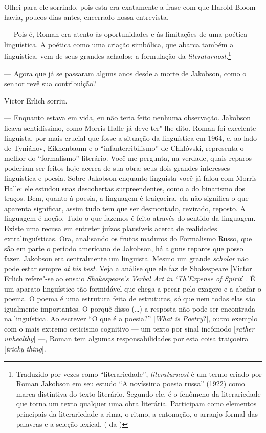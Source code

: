 Olhei para ele sorrindo, pois esta era exatamente a frase com que Harold
Bloom havia, poucos dias antes, encerrado nossa entrevista.

--- Pois é, Roman era atento às oportunidades e às limitações de uma
poética linguística. A poética como uma criação simbólica, que abarca
também a linguística, vem de seus grandes achados: a formulação da
\emph{literaturnost}.\footnote{Traduzido por vezes como 
``literariedade'', \emph{literaturnost} é um termo criado por Roman 
Jakobson em seu estudo ``A novíssima poesia russa'' 
(1922) como marca distintiva do texto literário. Segundo ele, é o
 fenômeno da literariedade que torna um texto qualquer uma obra
 literária. Participam como elementos principais da literariedade 
a rima, o ritmo, a entonação, o arranjo formal das palavras e a
 seleção lexical. ( da )}

--- Agora que já se passaram alguns anos desde a morte de Jakobson, como o
senhor revê sua contribuição?

Victor Erlich sorriu.

--- Enquanto estava em vida, eu não teria feito nenhuma observação.
Jakobson ficava sentidíssimo, como Morris Halle já deve ter"-lhe dito.
Roman foi excelente linguista, por mais crucial que fosse a situação da
linguística em 1964, e, ao lado de Tyniánov, Eikhenbaum e o
``infanterribilismo'' de Chklóvski, representa o melhor do
``formalismo'' literário. Você me pergunta, na verdade, quais reparos poderiam ser feitos
hoje acerca de sua obra: seus dois grandes interesses --- linguística e
poesia. Sobre Jakobson enquanto linguista você já falou com Morris Halle: ele
estudou suas descobertas surpreendentes, como a do binarismo dos traços.
Bem, quanto à poesia, a linguagem é traiçoeira, ela não significa o que
aparenta significar, assim tudo tem que ser desmontado, revirado,
reposto. A linguagem é noção. Tudo o que fazemos é feito através do sentido da
linguagem. Existe uma recusa em entreter juízos plausíveis acerca de
realidades extralinguísticas. Ora, analisando os frutos maduros do Formalismo Russo, que são em parte
o período americano de Jakobson, há alguns reparos que posso fazer.
 Jakobson era centralmente um linguista. Mesmo um grande \emph{scholar} não pode
estar sempre \emph{at his best}.
Veja a análise que ele faz de Shakespeare [Victor Erlich
 refere"-se ao ensaio \emph{Shakespeare's Verbal Art in `Th'Expense of
 Spirit}']. É um aparato linguístico tão formidável que chega a
pecar pelo exagero e a abafar o poema. O poema é uma estrutura feita de
estruturas, só que nem todas elas são igualmente importantes. O porquê
disso (\ldots{}) a resposta não pode ser encontrada na linguística.
 Ao escrever ``O que é a poesia?'' [\emph{What is
 Poetry}?], outro exemplo com o mais extremo
ceticismo cognitivo --- um texto por sinal incômodo [\emph{rather
unhealthy}] ---, Roman tem algumas responsabilidades por esta coisa
traiçoeira [\emph{tricky thing}].

